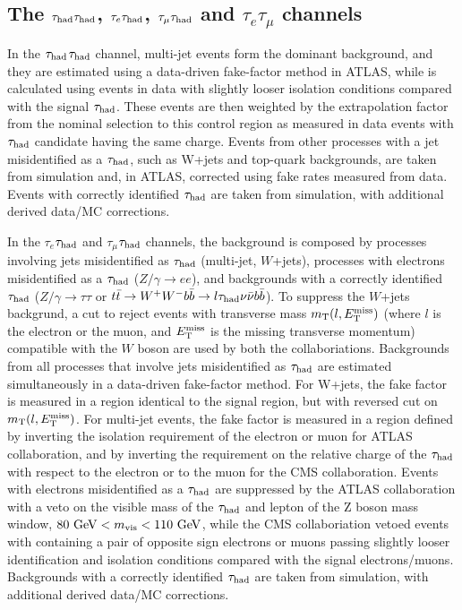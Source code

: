 \subsection{The $\tau_{\rm had}\tau_{\rm had}$, $\tau_{e}\tau_{\rm had}$, $\tau_{\mu}\tau_{\rm had}$ and $\tau_{e}\tau_{\mu}$ channels}
In the $\tau_{\rm had}$$\tau_{\rm had}$ channel, multi-jet events form the dominant background, and they are estimated using a data-driven fake-factor method in ATLAS, while is calculated using events in data with slightly looser  isolation conditions compared with the signal $\tau_{\rm had}$. These events are then weighted by the extrapolation factor from the nominal selection to this control region as measured in data events with $\tau_{\rm had}$ candidate having the same charge. Events from other processes with a jet misidentified
as a $\tau_{\rm had}$, such as W+jets and top-quark backgrounds, are taken from simulation and, in ATLAS,
corrected using fake rates measured from data. Events with correctly identified $\tau_{\rm had}$ are taken
from simulation, with additional derived data/MC corrections.


In the $\tau_{e}$$\tau_{\rm had}$ and $\tau_{\mu}$$\tau_{\rm had}$ channels, the background is composed by  processes involving jets misidentified as $\tau_{\rm had}$ (multi-jet, $W$+jets),  processes with electrons misidentified as a $\tau_{\rm had}$ ($Z/\gamma\rightarrow ee$), and backgrounds with a correctly identified $\tau_{\rm had}$ ($Z/\gamma\rightarrow \tau\tau$ or $t\bar{t}\rightarrow W^{+}W^{-}b\bar{b}\rightarrow l \tau_{\rm had}\nu \bar{\nu}b\bar{b}$).
To suppress the $W$+jets backgrund, a cut to reject events with transverse mass $m_{\rm T}(l,E_{\rm T}^{\rm miss})$ (where $l$ is the electron or the muon, and $E_{\rm T}^{\rm miss}$ is the missing transverse momentum) compatible with the $W$ boson are used by both the collaboriations.
Backgrounds from all processes that involve jets misidentified as $\tau_{\rm had}$ are estimated simultaneously in a data-driven fake-factor method. For W+jets, the fake factor is measured in a region identical to the signal region, but with reversed cut on $m_{\rm T}(l, E_{\rm T}^{\rm miss})$. For multi-jet events, the fake factor is measured in a region defined by inverting the isolation requirement of the electron or muon for ATLAS collaboration, and by inverting the requirement on the relative charge of the $\tau_{\rm had}$ with respect to the electron or to the muon for the CMS collaboration.
Events with electrons misidentified as a $\tau_{\rm had}$ are suppressed by the ATLAS collaboration with a veto on the visible mass of the $\tau_{\rm had}$ and lepton of the Z boson mass window, $80~{\rm GeV} < m_{\rm vis} < 110~{\rm GeV}$, while the CMS collaboriation vetoed events with containing a pair of opposite sign electrons or muons passing slightly looser identification and isolation conditions compared with the signal electrons/muons.
Backgrounds with a correctly identified $\tau_{\rm had}$ are taken from simulation, with additional derived data/MC corrections.

